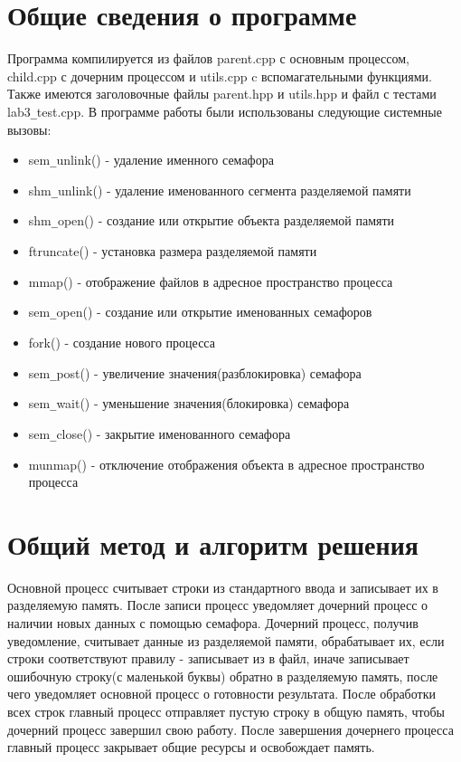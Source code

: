 \documentclass[a4paper, 14pt]{article}
\begin{document}
\section*{Общие сведения о программе}

Программа компилируется из файлов parent.cpp с основным процессом, child.cpp с дочерним процессом и utils.cpp c вспомагательными функциями. Также имеются заголовочные файлы parent.hpp и utils.hpp и файл с тестами lab3\texttt{\_}test.cpp. В программе работы были использованы следующие системные вызовы:

\begin{itemize}
    \item sem\texttt{\_}unlink() - удаление именного семафора
    \item shm\texttt{\_}unlink() - удаление именованного сегмента разделяемой памяти 
    \item shm\texttt{\_}open() - создание или открытие объекта разделяемой памяти 
    \item ftruncate() - установка размера разделяемой памяти
    \item mmap() - отображение файлов в адресное пространство процесса 
    \item sem\texttt{\_}open() - создание или открытие именованных семафоров
    \item fork() - создание нового процесса
    \item sem\texttt{\_}post() - увеличение значения(разблокировка) семафора
    \item sem\texttt{\_}wait() - уменьшение значения(блокировка) семафора
    \item sem\texttt{\_}close() - закрытие именованного семафора
    \item munmap() - отключение отображения объекта в адресное пространство процесса
\end{itemize}

\section*{Общий метод и алгоритм решения}

Основной процесс считывает строки из стандартного ввода и записывает их в разделяемую память. После записи процесс уведомляет дочерний процесс о наличии новых данных с помощью семафора. Дочерний процесс, получив уведомление, считывает данные из разделяемой памяти, обрабатывает их, если строки соответствуют правилу - записывает из в файл, иначе записывает ошибочную строку(с маленькой буквы) обратно в разделяемую память, после чего уведомляет основной процесс о готовности результата. После обработки всех строк главный процесс отправляет пустую строку в общую память, чтобы дочерний процесс завершил свою работу. После завершения дочернего процесса главный процесс закрывает общие ресурсы и освобождает память.
\newpage
\end{document}
